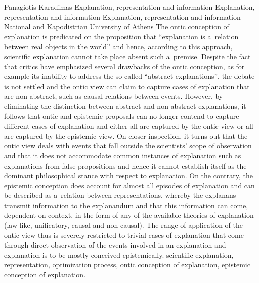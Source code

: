 \begin{artengenv}{Panagiotis Karadimas}
	{Explanation, representation and information}
	{Explanation, representation and information}
	{Explanation, representation and information}
	{National and Kapodistrian University of Athens}
	{The ontic conception of explanation is predicated on the proposition that ``explanation is a~relation between real objects in the world'' and hence, according to this approach, scientific explanation cannot take place absent such a~premise. Despite the fact that critics have emphasized several drawbacks of the ontic conception, as for example its inability to address the so-called ``abstract explanations'', the debate is not settled and the ontic view can claim to capture cases of explanation that are non-abstract, such as causal relations between events. However, by eliminating the distinction between abstract and non-abstract explanations, it follows that ontic and epistemic proposals can no longer contend to capture different cases of explanation and either all are captured by the ontic view or all are captured by the epistemic view. On closer inspection, it turns out that the ontic view deals with events that fall outside the scientists' scope of observation and that it does not accommodate common instances of explanation such as explanations from false propositions and hence it cannot establish itself as the dominant philosophical stance with respect to explanation. On the contrary, the epistemic conception does account for almost all episodes of explanation and can be described as a~relation between representations, whereby the explanans transmit information to the explanandum and that this information can come, dependent on context, in the form of any of the available theories of explanation (law-like, unificatory, causal and non-causal). The range of application of the ontic view thus is severely restricted to trivial cases of explanation that come through direct observation of the events involved in an explanation and explanation is to be mostly conceived epistemically.
	}
	{scientific explanation, representation, optimization process, ontic conception of explanation, epistemic conception of explanation.}




\end{artengenv}

